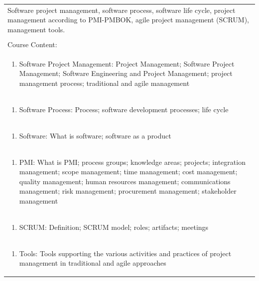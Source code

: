 \documentclass[11pt]{article}
\begin{document}
\begin{center}
\begin{longtable}{|p{4cm}|p{4cm}|p{4cm}|p{4cm}|}
\multicolumn{4}{|p{\dimexpr 16cm + 6\tabcolsep\relax}|}{Software project management, software process, software life cycle, project management according to PMI-PMBOK, agile project management (SCRUM), management tools.}\\
\multicolumn{4}{|p{16cm}|}{}\\
\hline
\multicolumn{4}{|p{16cm}|}{Course Content:}\\*
\multicolumn{4}{|p{\dimexpr 16cm + 6\tabcolsep\relax}|}{\begin{enumerate}[start=1]\item Software Project Management: Project Management; Software Project Management; Software Engineering and Project Management; project management process; traditional and agile management\end{enumerate}}\\
\multicolumn{4}{|p{\dimexpr 16cm + 6\tabcolsep\relax}|}{\begin{enumerate}[start=2]\item Software Process: Process; software development processes; life cycle\end{enumerate}}\\
\multicolumn{4}{|p{\dimexpr 16cm + 6\tabcolsep\relax}|}{\begin{enumerate}[start=3]\item Software: What is software; software as a product\end{enumerate}}\\
\multicolumn{4}{|p{\dimexpr 16cm + 6\tabcolsep\relax}|}{\begin{enumerate}[start=4]\item PMI: What is PMI; process groups; knowledge areas; projects; integration management; scope management; time management; cost management; quality management; human resources management; communications management; risk management; procurement management; stakeholder management\end{enumerate}}\\
\multicolumn{4}{|p{\dimexpr 16cm + 6\tabcolsep\relax}|}{\begin{enumerate}[start=5]\item SCRUM: Definition; SCRUM model; roles; artifacts; meetings\end{enumerate}}\\
\multicolumn{4}{|p{\dimexpr 16cm + 6\tabcolsep\relax}|}{\begin{enumerate}[start=6]\item Tools: Tools supporting the various activities and practices of project management in traditional and agile approaches\end{enumerate}}\\

\end{longtable}
\end{center}
\end{document}
